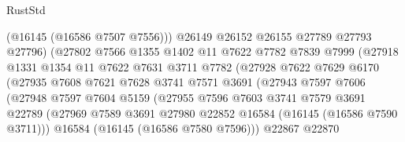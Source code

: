 \begin{lexlean}{RustStd}
\begin{coremodule}
                                (@16145 (@16586 @7507 @7556)))
                              @26149
                              @26152
                              @26155
                              @27789
                              @27793
                              @27796)
                            (@27802
                              @7566
                              @1355
                              @1402
                              @11
                              @7622
                              @7782
                              @7839
                              @7999
                              (@27918
                                @1331
                                @1354
                                @11
                                @7622
                                @7631
                                @3711
                                @7782
                                (@27928
                                  @7622
                                  @7629
                                  @6170
                                  (@27935
                                    @7608
                                    @7621
                                    @7628
                                    @3741
                                    @7571
                                    @3691
                                    (@27943
                                      @7597
                                      @7606
                                      (@27948
                                        @7597
                                        @7604
                                        @5159
                                        (@27955
                                          @7596
                                          @7603
                                          @3741
                                          @7579
                                          @3691
                                          @22789
                                          (@27969
                                            @7589
                                            @3691
                                            @27980
                                            @22852
                                            @16584
                                            (@16145 (@16586 @7590 @3711)))
                                          @16584
                                          (@16145 (@16586 @7580 @7596)))
                                        @22867
                                        @22870

\end{coremodule}
\end{lexlean}
